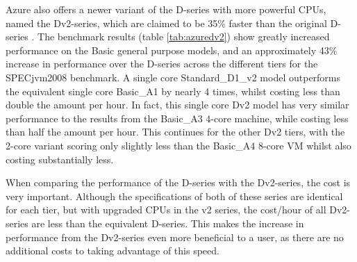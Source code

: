 \documentclass{entcs} \usepackage{entcsmacro}
\begin{document}
Azure also offers a newer variant of the D-series with more powerful CPUs, named the Dv2-series, which are claimed to be 35\% faster than the original D-series \cite{azurevmtype}. The benchmark results (table \ref{tab:azuredv2}) show greatly increased performance on the Basic general purpose models, and an approximately 43\% increase in performance over the D-series across the different tiers for the SPECjvm2008 benchmark. A single core Standard\_D1\_v2 model outperforms the equivalent single core Basic\_A1 by nearly 4 times, whilst costing less than double the amount per hour. In fact, this single core Dv2 model has very similar performance to the results from the Basic\_A3 4-core machine, while costing less than half the amount per hour. This continues for the other Dv2 tiers, with the 2-core variant scoring only slightly less than the Basic\_A4 8-core VM whilst also costing substantially less.

When comparing the performance of the D-series with the Dv2-series, the cost is very important. Although the specifications of both of these series are identical for each tier, but with upgraded CPUs in the v2 series, the cost/hour of all Dv2-series are less than the equivalent D-series. This makes the increase in performance from the Dv2-series even more beneficial to a user, as there are no additional costs to taking advantage of this speed.
\end{document}
